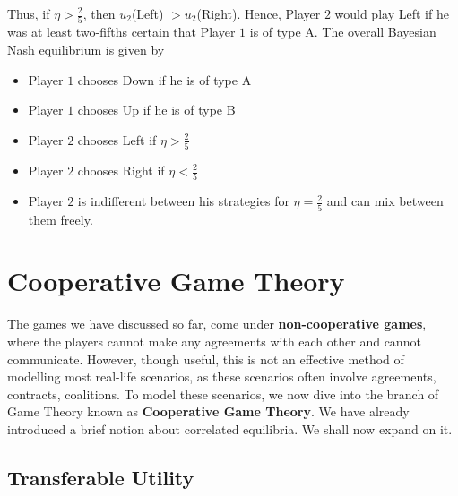 \documentclass{article}
\theoremstyle{definition}
\begin{document}
Thus, if $\eta > \frac{2}{5}$, then $u_2$(Left) $> u_2$(Right). Hence, Player $2$ would play Left if he was at least two-fifths certain that Player $1$ is of type A. The overall Bayesian Nash equilibrium is given by 

\begin{itemize}
    \item Player $1$ chooses Down if he is of type A
    \item Player $1$ chooses Up if he is of type B
    \item Player $2$ chooses Left if $\eta > \frac{2}{5}$
    \item Player $2$ chooses Right if $\eta < \frac{2}{5}$
    \item Player $2$ is indifferent between his strategies for $\eta = \frac{2}{5}$ and can mix between them freely.
\end{itemize}

\section{Cooperative Game Theory}

The games we have discussed so far, come under \textbf{non-cooperative games}, where the players cannot make any agreements with each other and cannot communicate. However, though useful, this is not an effective method of modelling most real-life scenarios, as these scenarios often involve agreements, contracts, coalitions. To model these scenarios, we now dive into the branch of Game Theory known as \textbf{Cooperative Game Theory}. We have already introduced a brief notion about correlated equilibria. We shall now expand on it. 

\subsection{Transferable Utility}
\end{document}
